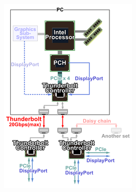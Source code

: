\documentclass[aspectratio=43]{beamer}
\begin{document}
\begin{frame}{}
	 
	\begin{center}
		\includegraphics[width=0.55\linewidth]{extrahovane_obrazky/img_4_page5_0.png}
	\end{center}
	
\end{frame}
\end{document}
